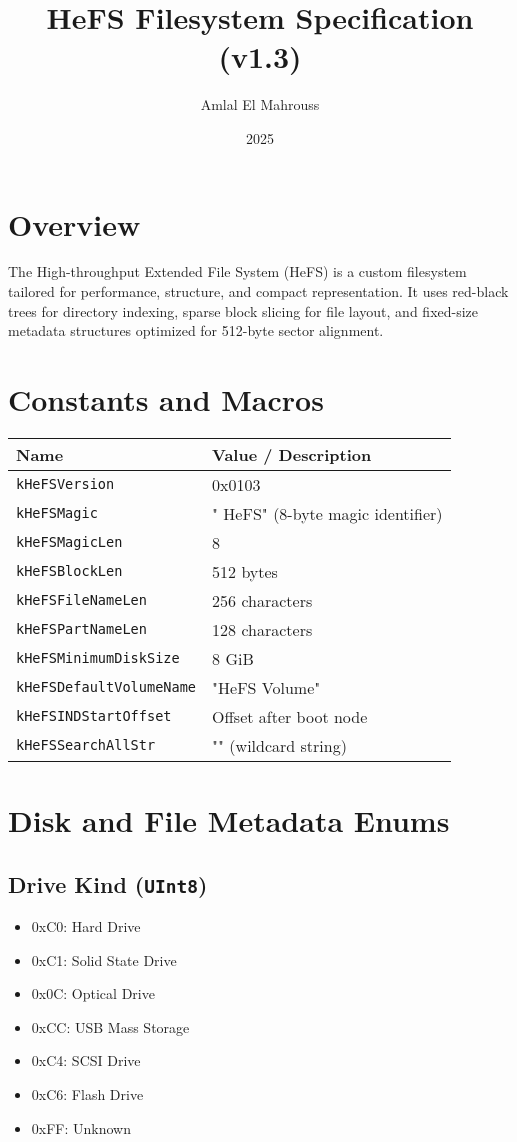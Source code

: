 \documentclass{article}
\title{HeFS Filesystem Specification (v1.3)}
\author{Amlal El Mahrouss}
\date{2025}
\begin{document}
\maketitle

\section{Overview}
The High-throughput Extended File System (HeFS) is a custom filesystem tailored for performance, structure, and compact representation. It uses red-black trees for directory indexing, sparse block slicing for file layout, and fixed-size metadata structures optimized for 512-byte sector alignment.

\section{Constants and Macros}
\begin{longtable}{|l|l|}
\hline
\textbf{Name} & \textbf{Value / Description} \\
\hline
\texttt{kHeFSVersion} & 0x0103 \\
\texttt{kHeFSMagic} & "  HeFS" (8-byte magic identifier) \\
\texttt{kHeFSMagicLen} & 8 \\
\texttt{kHeFSBlockLen} & 512 bytes \\
\texttt{kHeFSFileNameLen} & 256 characters \\
\texttt{kHeFSPartNameLen} & 128 characters \\
\texttt{kHeFSMinimumDiskSize} & 8 GiB \\
\texttt{kHeFSDefaultVolumeName} & "HeFS Volume" \\
\texttt{kHeFSINDStartOffset} & Offset after boot node \\
\texttt{kHeFSSearchAllStr} & "\*" (wildcard string) \\
\hline
\end{longtable}

\section{Disk and File Metadata Enums}\label{sec:disk-and-file-metadata-enums}

\subsection{Drive Kind (\texttt{UInt8})}\label{subsec:drive-kind-(texttt{uint8})}
\begin{itemize}
\item 0xC0: Hard Drive
\item 0xC1: Solid State Drive
\item 0x0C: Optical Drive
\item 0xCC: USB Mass Storage
\item 0xC4: SCSI Drive
\item 0xC6: Flash Drive
\item 0xFF: Unknown
\end{itemize}
\end{document}
